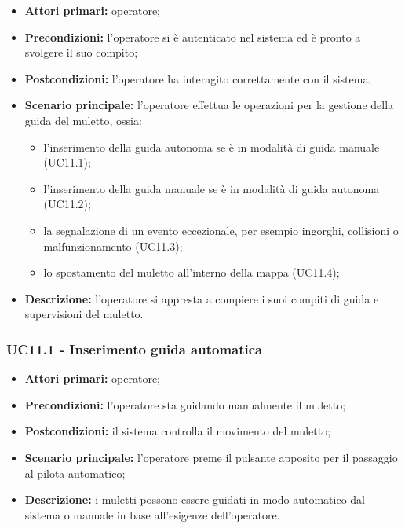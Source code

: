 \begin{itemize}
	\item 	\textbf{Attori primari:} operatore;
	\item 	\textbf{Precondizioni:} l’operatore si è autenticato nel sistema ed è pronto a svolgere il suo compito;
	\item 	\textbf{Postcondizioni:} l’operatore ha interagito correttamente con il sistema; 
	\item 	\textbf{Scenario principale:} l’operatore effettua le operazioni per la gestione della guida del muletto, ossia:
	\begin{itemize}
		\item l’inserimento della guida autonoma se è in modalità di guida manuale (UC11.1);
		\item l’inserimento della guida manuale se è in modalità di guida autonoma (UC11.2);
		\item la segnalazione di un evento eccezionale, per esempio ingorghi, collisioni o malfunzionamento (UC11.3);
		\item lo spostamento del muletto all’interno della mappa (UC11.4);
	\end{itemize}
	\item 	\textbf{Descrizione:} l’operatore si appresta a compiere i suoi compiti di guida e supervisioni del muletto. 

\end{itemize}

\subsubsection{UC11.1 - Inserimento guida automatica}
\begin{itemize}
	\item 	\textbf{Attori primari:} operatore;
	\item 	\textbf{Precondizioni:} l’operatore sta guidando manualmente il muletto;
	\item 	\textbf{Postcondizioni:} il sistema controlla il movimento del muletto;
	\item 	\textbf{Scenario principale:} l’operatore preme il pulsante apposito per il passaggio al pilota automatico;
	\item 	\textbf{Descrizione:} i muletti possono essere guidati in modo automatico dal sistema o manuale in base all’esigenze dell’operatore.
\end{itemize}

